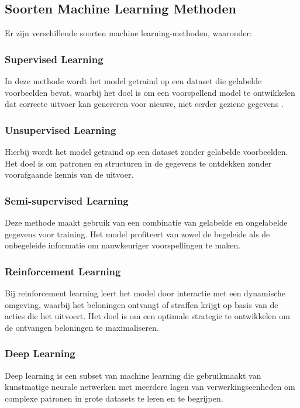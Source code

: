 \subsection{Soorten Machine Learning Methoden}

Er zijn verschillende soorten machine learning-methoden, waaronder:

\subsubsection{Supervised Learning}
In deze methode wordt het model getraind op een dataset die gelabelde voorbeelden bevat, waarbij het doel is om een voorspellend model te ontwikkelen dat correcte uitvoer kan genereren voor nieuwe, niet eerder geziene gegevens \autocite{Mahesh2019}.

\subsubsection{Unsupervised Learning}
Hierbij wordt het model getraind op een dataset zonder gelabelde voorbeelden. Het doel is om patronen en structuren in de gegevens te ontdekken zonder voorafgaande kennis van de uitvoer\autocite{Mahesh2019}.

\subsubsection{Semi-supervised Learning}
Deze methode maakt gebruik van een combinatie van gelabelde en ongelabelde gegevens voor training. Het model profiteert van zowel de begeleide als de onbegeleide informatie om nauwkeuriger voorspellingen te maken\autocite{Mahesh2019}.

\subsubsection{Reinforcement Learning}
Bij reinforcement learning leert het model door interactie met een dynamische omgeving, waarbij het beloningen ontvangt of straffen krijgt op basis van de acties die het uitvoert. Het doel is om een optimale strategie te ontwikkelen om de ontvangen beloningen te maximaliseren\autocite{Mahesh2019}.

\subsubsection{Deep Learning}
Deep learning is een subset van machine learning die gebruikmaakt van kunstmatige neurale netwerken met meerdere lagen van verwerkingseenheden om complexe patronen in grote datasets te leren en te begrijpen\autocite{Mahesh2019}.

